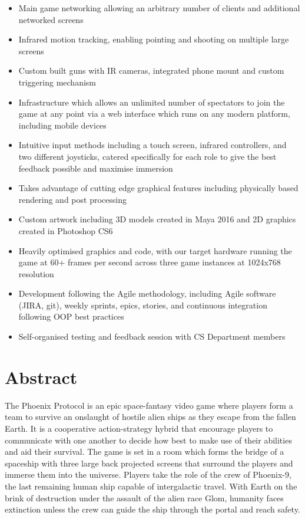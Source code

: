 \documentclass[a4paper,11pt]{article}
\begin{document}
\begin{itemize}
	\large

  \item Main game networking allowing an arbitrary number of clients and additional networked screens
  \item Infrared motion tracking, enabling pointing and shooting on multiple large screens
  \item Custom built guns with IR cameras, integrated phone mount and custom triggering mechanism
  \item Infrastructure which allows an unlimited number of spectators to join the game at any point via a web interface which runs on any modern platform, including mobile devices
  \item Intuitive input methods including a touch screen, infrared controllers, and two different joysticks, catered specifically for each role to give the best feedback possible and maximise immersion 
  \item Takes advantage of cutting edge graphical features including physically based rendering and post processing
  \item Custom artwork including 3D models created in Maya 2016 and 2D graphics created in Photoshop CS6
  \item Heavily optimised graphics and code, with our target hardware running the game at 60+ frames per second across three game instances at 1024x768 resolution
      \item Development following the Agile methodology, including Agile software (JIRA, git), weekly sprints, epics, stories, and continuous integration following OOP best practices
  \item Self-organised testing and feedback session with CS Department members 
\end{itemize}

\clearpage

\section{Abstract}
The Phoenix Protocol is an epic space-fantasy video game where players form a team to survive an onslaught of hostile alien ships as they escape from the fallen Earth. It is a cooperative action-strategy hybrid that encourage players to communicate with one another to decide how best to make use of their abilities and aid their survival. The game is set in a room which forms the bridge of a spaceship with three large back projected screens that surround the players and immerse them into the universe. 
Players take the role of the crew of Phoenix-9, the last remaining human ship capable of intergalactic travel. With Earth on the brink of destruction under the assault of the alien race Glom, humanity faces extinction unless the crew can guide the ship through the portal and reach safety.
\end{document}
